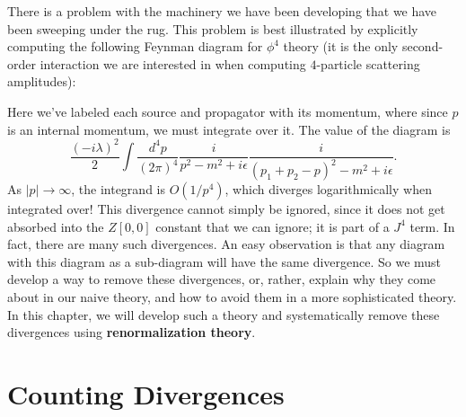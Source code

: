 \documentclass{report}
\theoremstyle{plain}
\theoremstyle{definition}
\theoremstyle{remark}
\begin{document}
There is a problem with the machinery we have been developing that we
have been sweeping under the rug. This problem is best illustrated by
explicitly computing the following Feynman diagram for $\phi^4$ theory
(it is the only second-order interaction we are interested in when
computing $4$-particle scattering amplitudes):
\begin{center}
\end{center}
Here we've labeled each source and propagator with its momentum, where
since $p$ is an internal momentum, we must integrate over it. The
value of the diagram is
$$ \frac{(-i\lambda)^2}{2} \int \frac{d^4p}{(2\pi)^4} \frac{i}{p^2 - m^2 + i\epsilon} \frac{i}{(p_1 + p_2 - p)^2 - m^2 + i\epsilon}. $$
As $|p| \to \infty$, the integrand is $O(1/p^4)$, which diverges
logarithmically when integrated over! This divergence cannot simply be
ignored, since it does not get absorbed into the $Z[0,0]$ constant
that we can ignore; it is part of a $J^4$ term. In fact, there are
many such divergences. An easy observation is that any diagram with
this diagram as a sub-diagram will have the same divergence. So we
must develop a way to remove these divergences, or, rather, explain
why they come about in our naive theory, and how to avoid them in a
more sophisticated theory. In this chapter, we will develop such a
theory and systematically remove these divergences using {\bf
  renormalization theory}.

\section{Counting Divergences}
\end{document}
